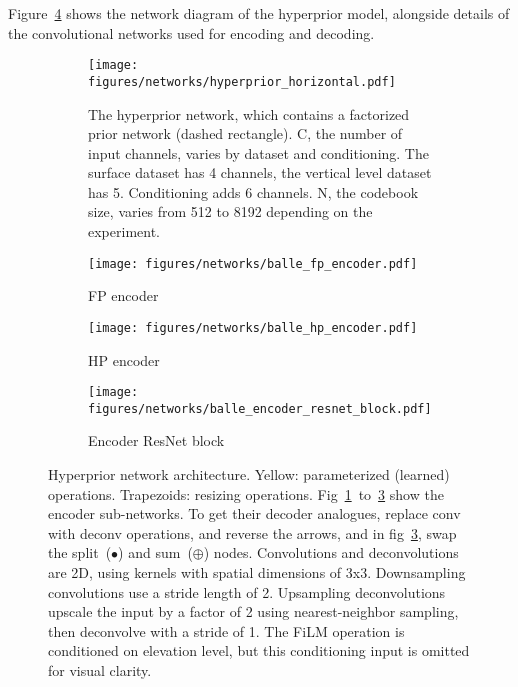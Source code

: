 Figure~\ref{fig:balle} shows the network diagram of the hyperprior model, alongside details of the convolutional networks used for encoding and decoding.
%
\begin{figure}
    \centering
    \begin{subfigure}[t]{\textwidth}
        \centering
        \texttt{[image: figures/networks/hyperprior\_horizontal.pdf]}
        \caption{The hyperprior network, which contains a factorized prior network (dashed rectangle). C, the number of input channels, varies by dataset and conditioning. The surface dataset has 4 channels, the vertical level dataset has 5. Conditioning adds 6 channels. N, the codebook size, varies from 512 to 8192 depending on the experiment.}
    \end{subfigure}
    \par\bigskip %
    \hfill
    \begin{subfigure}[b]{.3\textwidth}
        \centering
        \texttt{[image: figures/networks/balle\_fp\_encoder.pdf]}
        \caption{FP encoder\label{fig:balle:fp_encoder}}
    \end{subfigure}
    \hfill
    \begin{subfigure}[b]{0.3\textwidth}
        \centering
        \texttt{[image: figures/networks/balle\_hp\_encoder.pdf]}
        \caption{HP encoder\label{fig:balle:hp_encoder}}
    \end{subfigure}
    \hfill
    \begin{subfigure}[b]{0.3\textwidth}
        \centering
        \texttt{[image: figures/networks/balle\_encoder\_resnet\_block.pdf]}
        \vspace{.4in}
        \caption{Encoder ResNet block\label{fig:balle:resnet}}
    \end{subfigure}
    \hfill
    \caption{Hyperprior network architecture. Yellow: parameterized (learned) operations. Trapezoids: resizing operations. Fig~\ref{fig:balle:fp_encoder}~to~\ref{fig:balle:resnet} show the encoder sub-networks. To get their decoder analogues, replace conv with deconv operations, and reverse the arrows, and in fig~\ref{fig:balle:resnet}, swap the split~($\bullet$) and  sum~($\oplus$) nodes. Convolutions and deconvolutions are 2D, using kernels with spatial dimensions of 3x3. Downsampling convolutions use a stride length of 2. Upsampling deconvolutions upscale the input by a factor of 2 using nearest-neighbor sampling, then deconvolve with a stride of 1. The FiLM operation is conditioned on elevation level, but this conditioning input is omitted for visual clarity.\label{fig:balle}}
\end{figure}
